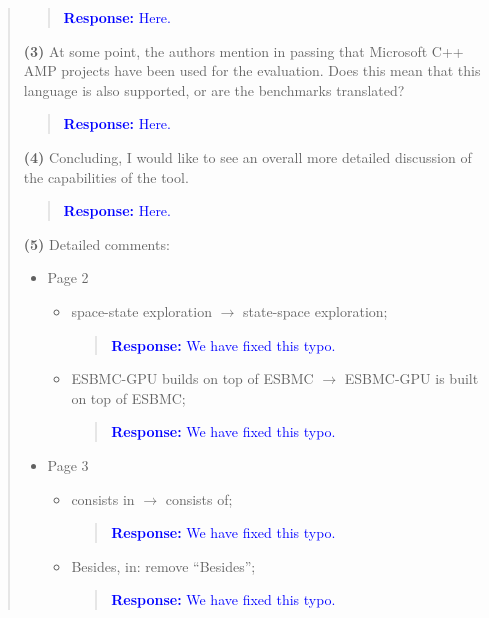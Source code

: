 \documentclass[11pt]{article}
\begin{document}
\begin{quote}
\begin{quote}
\textcolor{blue}{\textbf{Response:} Here.}
\end{quote}

{\bf (3)} At some point, the authors mention in passing that Microsoft C++ AMP projects have been used for the evaluation. Does this mean that this language is also supported, or are the benchmarks translated?

\begin{quote}
\textcolor{blue}{\textbf{Response:} Here.}
\end{quote}

{\bf (4)} Concluding, I would like to see an overall more detailed discussion of the capabilities of the tool.

\begin{quote}
\textcolor{blue}{\textbf{Response:} Here.}
\end{quote}

{\bf (5)} Detailed comments:
\begin{itemize}
\item Page 2
  \begin{itemize}
  \item space-state exploration $\rightarrow$ state-space exploration;
  
    \begin{quote}
    \textcolor{blue}{\textbf{Response:} We have fixed this typo.}
    \end{quote}

  \item ESBMC-GPU builds on top of ESBMC $\rightarrow$ ESBMC-GPU is built on top of ESBMC;
  
    \begin{quote}
    \textcolor{blue}{\textbf{Response:} We have fixed this typo.}
    \end{quote}

  \end{itemize}
\item Page 3
  \begin{itemize}
  \item consists in $\rightarrow$ consists of;
  
    \begin{quote}
    \textcolor{blue}{\textbf{Response:} We have fixed this typo.}
    \end{quote}

  \item Besides, in: remove ``Besides'';
  
    \begin{quote}
    \textcolor{blue}{\textbf{Response:} We have fixed this typo.}
    \end{quote}


\end{itemize}
\end{itemize}
\end{quote}
\end{document}
